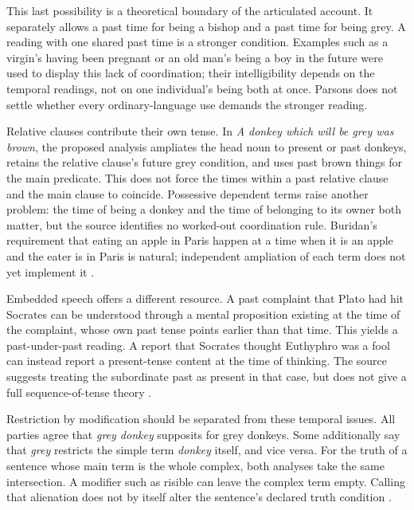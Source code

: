 This last possibility is a theoretical boundary of the articulated
account. It separately allows a past time for being a bishop and a past
time for being grey. A reading with one shared past time is a stronger
condition. Examples such as a virgin's having been pregnant or an old
man's being a boy in the future were used to display this lack of
coordination; their intelligibility depends on the temporal readings,
not on one individual's being both at once. Parsons does not settle
whether every ordinary-language use demands the stronger reading.

Relative clauses contribute their own tense. In \emph{A donkey which
will be grey was brown}, the proposed analysis ampliates the head noun
to present or past donkeys, retains the relative clause's future grey
condition, and uses past brown things for the main predicate. This
does not force the times within a past relative clause and the main
clause to coincide. Possessive dependent terms raise another problem:
the time of being a donkey and the time of belonging to its owner both
matter, but the source identifies no worked-out coordination rule.
Buridan's requirement that eating an apple in Paris happen at a time
when it is an apple and the eater is in Paris is natural; independent
ampliation of each term does not yet implement it
\cite[pp.~208--210]{Parsons2007FordhamSupposition}.

Embedded speech offers a different resource. A past complaint that
Plato had hit Socrates can be understood through a mental proposition
existing at the time of the complaint, whose own past tense points
earlier than that time. This yields a past-under-past reading. A report
that Socrates thought Euthyphro was a fool can instead report a
present-tense content at the time of thinking. The source suggests
treating the subordinate past as present in that case, but does not
give a full sequence-of-tense theory
\cite[pp.~210--211]{Parsons2007FordhamSupposition}.

Restriction by modification should be separated from these temporal
issues. All parties agree that \emph{grey donkey} supposits for grey
donkeys. Some additionally say that \emph{grey} restricts the simple
term \emph{donkey} itself, and vice versa. For the truth of a sentence
whose main term is the whole complex, both analyses take the same
intersection. A modifier such as risible can leave the complex term
empty. Calling that alienation does not by itself alter the sentence's
declared truth condition
\cite[pp.~205--206]{Parsons2007FordhamSupposition}.

